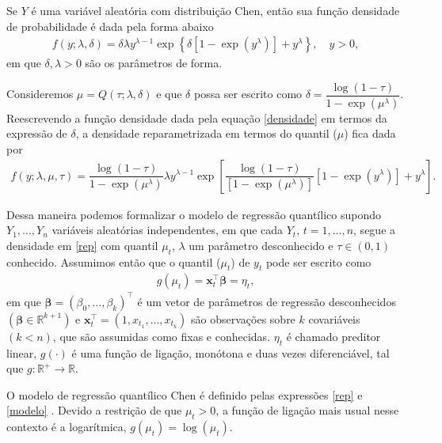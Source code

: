 \documentclass{sciposter}
\begin{document}
\begin{multicols*}{2}
{Se $Y$ é uma variável aleatória com distribuição Chen, então sua função densidade de probabilidade é dada pela forma abaixo \cite{chen2000new}
\vspace*{-0.1cm}
\begin{align}
\label{densidade}
f(y;\lambda, \delta)= \delta\lambda y^{\lambda - 1} \exp \left\lbrace \delta \left[ 1-\exp(y^{\lambda})\right] +y^{\lambda} \right\rbrace  , \quad  y > 0,
\end{align}
em que $ \delta , \lambda > 0 $ são os parâmetros de forma.

Consideremos $\mu= Q(\tau;\lambda , \delta)$ e que $\delta$ possa ser escrito como $\delta=\dfrac{\log(1-\tau)}{1-\exp(\mu^{\lambda})}$. Reescrevendo a função densidade dada pela equação \eqref{densidade} em termos da expressão de $\delta$, a densidade reparametrizada em termos do quantil ($\mu$) fica dada por
\begin{align}
\label{rep}
f(y ; \lambda, \mu, \tau)= \dfrac{\log(1-\tau)}{1-\exp(\mu^{\lambda})} \lambda  y^{\lambda - 1} \exp \left[ \dfrac{\log(1-\tau)}{[1-\exp(\mu^{\lambda})]} \left[ 1-\exp(y^{\lambda}) \right] +y^{\lambda} \right]. 
\end{align}


Dessa maneira podemos formalizar o modelo de regressão quantílico supondo $Y_1,\ldots, Y_n$  variáveis aleatórias independentes, em que cada $Y_t$, $t=1,\ldots,n$, segue a densidade em \eqref{rep} com quantil $\mu_t$, $\lambda$ um parâmetro desconhecido e $\tau \in (0,1)$ conhecido. Assumimos então que o quantil ($\mu_t$) de $y_t$  pode ser escrito como
\begin{align}\label{modelo}
g(\mu_t)=  \bm{x}_{t}^{\top} \bm{\beta}= \eta_t,
\end{align}
em que $\bm{\beta}= (\beta_0,\ldots, \beta_k)^{\top}$ é um vetor de parâmetros de regressão desconhecidos $( \bm{\beta} \in \mathbb{R}^{ k + 1}) $ e $\bm{x}_{t}^{\top}=(1, x_{t_1},\ldots, x_{t_k})$ são observações sobre $k$ covariáveis $(k<n)$,  que são assumidas como fixas e conhecidas. $\eta_t$ é chamado preditor linear, $g(\cdot)$ é uma função de ligação, monótona e duas vezes diferenciável, tal que $g: \mathbb{R}^{+}\rightarrow \mathbb{R}$. 

\vspace{0.2cm}
O modelo de regressão quantílico Chen é definido pelas expressões \eqref{rep} e \eqref{modelo} \cite{souza2021}. Devido a restrição de que $\mu_t > 0$, a função de ligação mais usual nesse contexto é a logarítmica, $g(\mu_t)=\log(\mu_t)$.

}
\end{multicols*}
\end{document}

